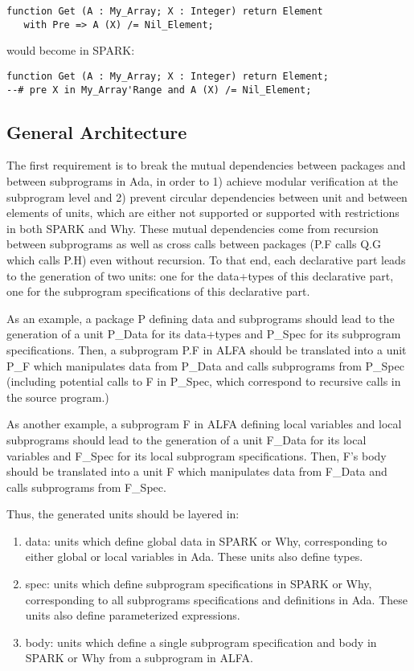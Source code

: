 \documentclass{article}
\begin{document}
\begin{verbatim}
function Get (A : My_Array; X : Integer) return Element
   with Pre => A (X) /= Nil_Element;
\end{verbatim}

would become in SPARK:

\begin{verbatim}
function Get (A : My_Array; X : Integer) return Element;
--# pre X in My_Array'Range and A (X) /= Nil_Element;
\end{verbatim}

\subsection{General Architecture}

The first requirement is to break the mutual dependencies between packages and
between subprograms in Ada, in order to 1) achieve modular verification at the
subprogram level and 2) prevent circular dependencies between unit and between
elements of units, which are either not supported or supported with
restrictions in both SPARK and Why. These mutual dependencies come from
recursion between subprograms as well as cross calls between packages (P.F
calls Q.G which calls P.H) even without recursion. To that end, each
declarative part leads to the generation of two units: one for the data+types
of this declarative part, one for the subprogram specifications of this
declarative part.

As an example, a package P defining data and subprograms should lead to the
generation of a unit P\_Data for its data+types and P\_Spec for its subprogram
specifications. Then, a subprogram P.F in ALFA should be translated into a unit
P\_F which manipulates data from P\_Data and calls subprograms from P\_Spec
(including potential calls to F in P\_Spec, which correspond to recursive calls
in the source program.)

As another example, a subprogram F in ALFA defining local variables and local
subprograms should lead to the generation of a unit F\_Data for its local
variables and F\_Spec for its local subprogram specifications. Then, F's body
should be translated into a unit F which manipulates data from F\_Data and
calls subprograms from F\_Spec.

Thus, the generated units should be layered in:
\begin{enumerate}
\item data: units which define global data in SPARK or Why, corresponding to
  either global or local variables in Ada. These units also define types.
\item spec: units which define subprogram specifications in SPARK or Why,
  corresponding to all subprograms specifications and definitions in Ada. These
  units also define parameterized expressions.
\item body: units which define a single subprogram specification and body in
  SPARK or Why from a subprogram in ALFA.
\end{enumerate}
\end{document}
